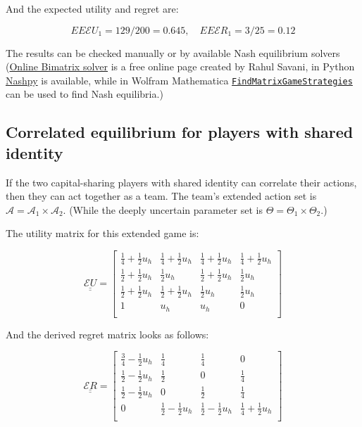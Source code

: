\documentclass{article}
\theoremstyle{definition}
\begin{document}
And the expected utility and regret are:

\begin{equation}
    EE\mathcal{E}U_1=129/200 = 0.645, \quad
    EE\mathcal{E}R_1 = 3/25 = 0.12
\end{equation}

The results can be checked manually or by available Nash equilibrium solvers (\href{https://cgi.csc.liv.ac.uk/~rahul/bimatrix_solver/}{Online Bimatrix solver} is a free online page created by Rahul Savani, in Python \href{https://nashpy.readthedocs.io/en/stable/}{Nashpy} is available, while in Wolfram Mathematica \href{https://reference.wolfram.com/language/ref/FindMatrixGameStrategies.html}{\tt FindMatrixGameStrategies} can be used to find Nash equilibria.)

\subsection{Correlated equilibrium for players with shared identity}

If the two capital-sharing players with shared identity can correlate their actions, then they can act together as a team. The team's extended action set is $\mathcal{A}=\mathcal{A}_1 \times \mathcal{A}_2$. (While the deeply uncertain parameter set is $\Theta = \Theta_1 \times \Theta_2$.)

The utility matrix for this extended game is:

\begin{equation}
    \underline{\underline{\mathcal{E}U}}
    =
    \begin{bmatrix}
    \frac{1}{4} +  \frac{1}{2} u_h & 
    \frac{1}{4} +  \frac{1}{2} u_h & 
    \frac{1}{4} +  \frac{1}{2} u_h & 
    \frac{1}{4} +  \frac{1}{2} u_h\\
    \frac{1}{2} + \frac{1}{2} u_h & 
    \frac{1}{2} u_h & 
    \frac{1}{2} + \frac{1}{2} u_h & 
    \frac{1}{2} u_h\\
    \frac{1}{2} + \frac{1}{2} u_h & 
    \frac{1}{2} + \frac{1}{2} u_h & 
    \frac{1}{2} u_h & 
    \frac{1}{2} u_h\\
    1 & 
    u_h & 
    u_h & 
    0\\
    \end{bmatrix}
\end{equation}

And the derived regret matrix looks as follows:

\begin{equation}
    \underline{\underline{\mathcal{E}R}}
    =
    \begin{bmatrix}
    \frac{3}{4} -  \frac{1}{2} u_h & 
    \frac{1}{4} & 
    \frac{1}{4} & 
    0\\
    \frac{1}{2} - \frac{1}{2} u_h & 
    \frac{1}{2} & 
    0 & 
    \frac{1}{4}\\
    \frac{1}{2} - \frac{1}{2} u_h & 
    0 & 
    \frac{1}{2} & 
    \frac{1}{4}\\
    0 & 
    \frac{1}{2} - \frac{1}{2} u_h & 
    \frac{1}{2} - \frac{1}{2} u_h & 
    \frac{1}{4} + \frac{1}{2} u_h\\
    \end{bmatrix}
\end{equation}
\end{document}
